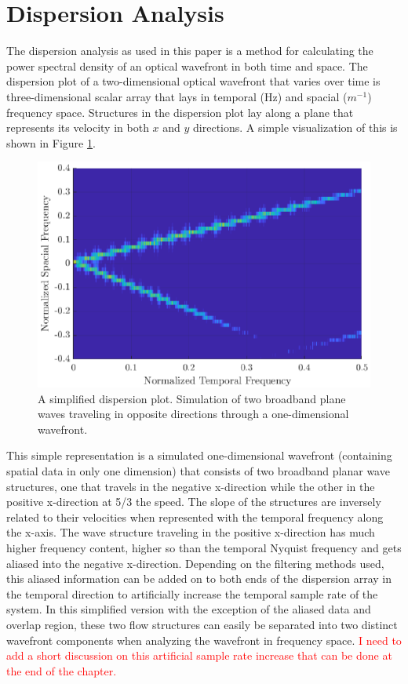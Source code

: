 \section{Dispersion Analysis}
The dispersion analysis as used in this paper is a method for calculating the power spectral density of an optical wavefront in both time and space.
The dispersion plot of a two-dimensional optical wavefront that varies over time is three-dimensional scalar array that lays in temporal (Hz) and spacial ($m^{-1}$) frequency space.
Structures in the dispersion plot lay along a plane that represents its velocity in both $x$ and $y$ directions.
A simple visualization of this is shown in Figure \ref{fig:04_simple_dispersion}.
\begin{figure}
 \centering
 \includegraphics{../matlab/04_basic_filtering/simple_dispersion.eps}
 \caption{A simplified dispersion plot.  Simulation of two broadband plane waves traveling in opposite directions through a one-dimensional wavefront.}
 \label{fig:04_simple_dispersion}
\end{figure}
This simple representation is a simulated one-dimensional wavefront (containing spatial data in only one dimension) that consists of two broadband planar wave structures, one that travels in the negative x-direction while the other in the positive x-direction at 5/3 the speed.
The slope of the structures are inversely related to their velocities when represented with the temporal frequency along the x-axis.
The wave structure traveling in the positive x-direction has much higher frequency content, higher so than the temporal Nyquist frequency and gets aliased into the negative x-direction.
Depending on the filtering methods used, this aliased information can be added on to both ends of the dispersion array in the temporal direction to artificially increase the temporal sample rate of the system.
In this simplified version with the exception of the aliased data and overlap region, these two flow structures can easily be separated into two distinct wavefront components when analyzing the wavefront in frequency space.
\textcolor{red}{I need to add a short discussion on this artificial sample rate increase that can be done at the end of the chapter.}

